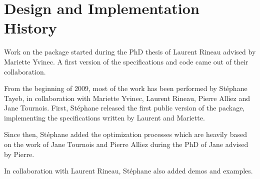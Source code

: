 

\section{Design and Implementation History}

Work on the package  started during the PhD thesis of Laurent Rineau
advised by Mariette Yvinec.  A first version of the specifications
and code came out of their collaboration.

From the beginning of 2009, most of the work has been performed by St\'ephane
Tayeb, in collaboration with Mariette Yvinec, Laurent Rineau, Pierre Alliez and Jane Tournois.
First, St\'ephane released the first public version of the package, implementing the specifications
written by Laurent and Mariette. 

Since then, St\'ephane added the optimization processes which are
heavily based on the work of Jane Tournois and Pierre Alliez
during the PhD of Jane advised by Pierre.

In collaboration with Laurent Rineau, St\'ephane also added demos and examples.

